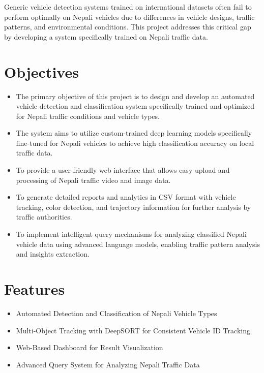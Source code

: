 \documentclass[12pt,a4paper]{report}
\begin{document}
Generic vehicle detection systems trained on international datasets often fail to perform optimally on Nepali vehicles due to differences in vehicle designs, traffic patterns, and environmental conditions. This project addresses this critical gap by developing a system specifically trained on Nepali traffic data.

\section{Objectives}

\begin{itemize}
    \item The primary objective of this project is to design and develop an automated vehicle detection and classification system specifically trained and optimized for Nepali traffic conditions and vehicle types.
    
    \item The system aims to utilize custom-trained deep learning models specifically fine-tuned for Nepali vehicles to achieve high classification accuracy on local traffic data.
    
    \item To provide a user-friendly web interface that allows easy upload and processing of Nepali traffic video and image data.
    
    \item To generate detailed reports and analytics in CSV format with vehicle tracking, color detection, and trajectory information for further analysis by traffic authorities.
    
    \item To implement intelligent query mechanisms for analyzing classified Nepali vehicle data using advanced language models, enabling traffic pattern analysis and insights extraction.
\end{itemize}

\section{Features}

\begin{itemize}
    \item Automated Detection and Classification of Nepali Vehicle Types
    \item Multi-Object Tracking with DeepSORT for Consistent Vehicle ID Tracking
    \item Web-Based Dashboard for Result Visualization
    \item Advanced Query System for Analyzing Nepali Traffic Data
\end{itemize}
\end{document}
